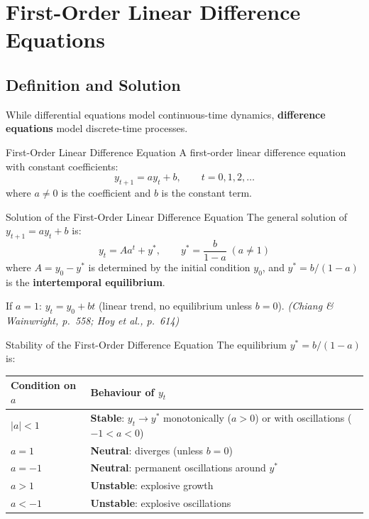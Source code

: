 \documentclass[12pt, a4paper]{article}
\theoremstyle{definition}
\begin{document}
\section{First-Order Linear Difference Equations}

\subsection{Definition and Solution}

While differential equations model continuous-time dynamics, \textbf{difference
equations} model discrete-time processes.

\begin{defbox}{First-Order Linear Difference Equation}
A first-order linear difference equation with constant coefficients:
\[
  y_{t+1} = ay_t + b, \qquad t = 0, 1, 2, \ldots
\]
where $a \neq 0$ is the coefficient and $b$ is the constant term.
\end{defbox}

\begin{thmbox}{Solution of the First-Order Linear Difference Equation}
The general solution of $y_{t+1} = ay_t + b$ is:
\[
  y_t = Aa^t + y^*, \qquad y^* = \frac{b}{1-a} \; (a\neq 1)
\]
where $A = y_0 - y^*$ is determined by the initial condition $y_0$,
and $y^* = b/(1-a)$ is the \textbf{intertemporal equilibrium}.

If $a=1$: $y_t = y_0 + bt$ (linear trend, no equilibrium unless $b=0$).
\emph{(Chiang \& Wainwright, p.\ 558; Hoy et al., p.\ 614)}
\end{thmbox}

\begin{keybox}{Stability of the First-Order Difference Equation}
The equilibrium $y^* = b/(1-a)$ is:
\begin{center}
\begin{tabular}{ll}
  \toprule
  \rowcolor{tabhead}
  \color{white}Condition on $a$ & \color{white}Behaviour of $y_t$ \\
  \midrule
  $|a| < 1$     & \textbf{Stable}: $y_t \to y^*$ monotonically ($a>0$)
                  or with oscillations ($-1<a<0$) \\
  \rowcolor{tabeven}
  $a = 1$       & \textbf{Neutral}: diverges (unless $b=0$) \\
  $a = -1$      & \textbf{Neutral}: permanent oscillations around $y^*$ \\
  \rowcolor{tabeven}
  $a > 1$       & \textbf{Unstable}: explosive growth \\
  $a < -1$      & \textbf{Unstable}: explosive oscillations \\
  \bottomrule
\end{tabular}
\end{center}
\end{keybox}
\end{document}
